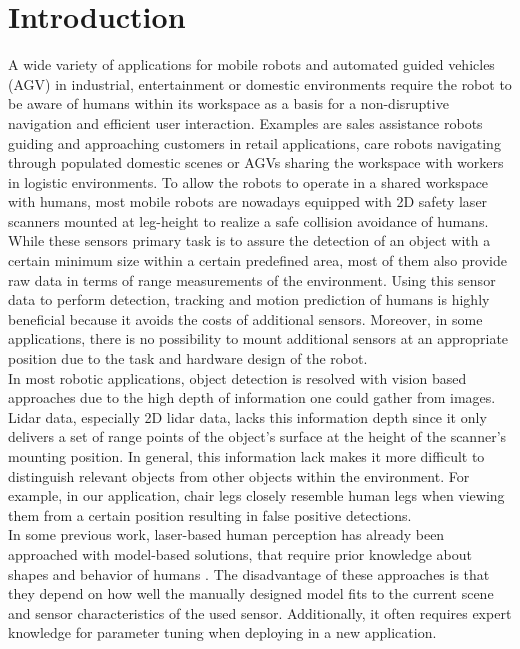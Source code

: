 \section{Introduction}
\label{sec:intro}

A wide variety of applications for mobile robots and automated guided vehicles (AGV) in industrial, entertainment or domestic environments require the robot to be aware of humans within its workspace as a basis for a non-disruptive navigation and efficient user interaction.
Examples are sales assistance robots guiding and approaching customers in retail applications, care robots navigating through populated domestic scenes or AGVs sharing the workspace with workers in logistic environments.
To allow the robots to operate in a shared workspace with humans, most mobile robots are nowadays equipped with 2D safety laser scanners mounted at leg-height to realize a safe collision avoidance of humans.
While these sensors primary task is to assure the detection of an object with a certain minimum size within a certain predefined area, most of them also provide raw data in terms of range measurements of the environment.
Using this sensor data to perform detection, tracking and motion prediction of humans is highly beneficial because it avoids the costs of additional sensors.
Moreover, in some applications, there is no possibility to mount additional sensors at an appropriate position due to the task and hardware design of the robot.\\
In most robotic applications, object detection is resolved with vision based approaches due to the high depth of information one could gather from images.
Lidar data, especially 2D lidar data, lacks this information depth since it only delivers a set of range points of the object's surface at the height of the scanner's mounting position.
In general, this information lack makes it more difficult to distinguish relevant objects from other objects within the environment.
For example, in our application, chair legs closely resemble human legs when viewing them from a certain position resulting in false positive detections.\\
In some previous work, laser-based human perception has already been approached with model-based solutions, that require prior knowledge about shapes and behavior of humans \cite{Arras07usingboosted} \cite{weinrich2014people}.
The disadvantage of these approaches is that they depend on how well the manually designed model fits to the current scene and sensor characteristics of the used sensor.
Additionally, it often requires expert knowledge for parameter tuning when deploying in a new application.\\
